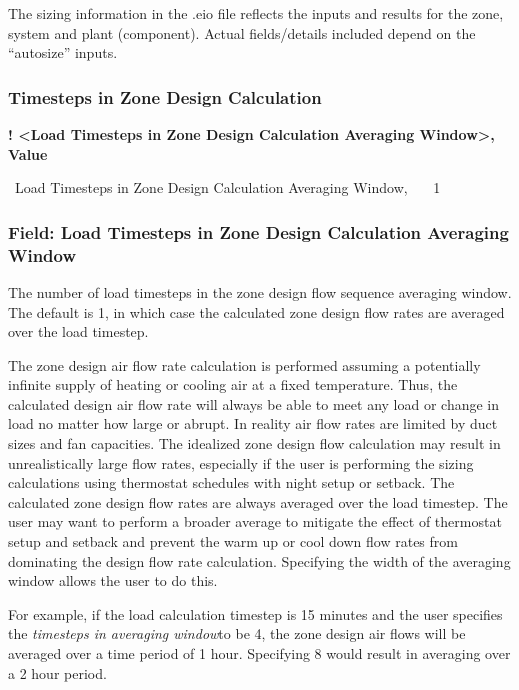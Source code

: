 The sizing information in the .eio file reflects the inputs and results for the zone, system and plant (component). Actual fields/details included depend on the ``autosize'' inputs.

\subsubsection{Timesteps in Zone Design Calculation}\label{timesteps-in-zone-design-calculation}

\textbf{! \textless{}Load Timesteps in Zone Design Calculation Averaging Window\textgreater{}, Value}

~Load Timesteps in Zone Design Calculation Averaging Window,~~~ 1

\subsubsection{Field: Load Timesteps in Zone Design Calculation Averaging Window}\label{field-load-timesteps-in-zone-design-calculation-averaging-window}

The number of load timesteps in the zone design flow sequence averaging window. The default is 1, in which case the calculated zone design flow rates are averaged over the load timestep.

The zone design air flow rate calculation is performed assuming a potentially infinite supply of heating or cooling air at a fixed temperature. Thus, the calculated design air flow rate will always be able to meet any load or change in load no matter how large or abrupt. In reality air flow rates are limited by duct sizes and fan capacities. The idealized zone design flow calculation may result in unrealistically large flow rates, especially if the user is performing the sizing calculations using thermostat schedules with night setup or setback. The calculated zone design flow rates are always averaged over the load timestep. The user may want to perform a broader average to mitigate the effect of thermostat setup and setback and prevent the warm up or cool down flow rates from dominating the design flow rate calculation. Specifying the width of the averaging window allows the user to do this.

For example, if the load calculation timestep is 15 minutes and the user specifies the \emph{timesteps in averaging window}to be 4, the zone design air flows will be averaged over a time period of 1 hour. Specifying 8 would result in averaging over a 2 hour period.

